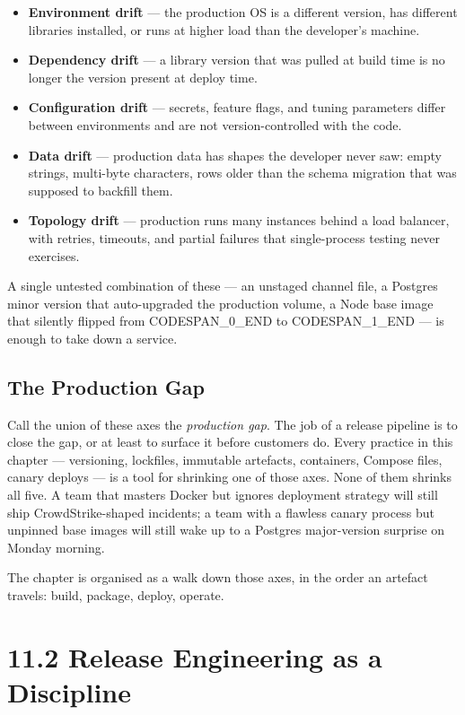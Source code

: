\documentclass[11pt,a4paper]{book}
\begin{document}
\begin{itemize}
  \item \textbf{Environment drift} --- the production OS is a different version, has different libraries installed, or runs at higher load than the developer's machine.
  \item \textbf{Dependency drift} --- a library version that was pulled at build time is no longer the version present at deploy time.
  \item \textbf{Configuration drift} --- secrets, feature flags, and tuning parameters differ between environments and are not version-controlled with the code.
  \item \textbf{Data drift} --- production data has shapes the developer never saw: empty strings, multi-byte characters, rows older than the schema migration that was supposed to backfill them.
  \item \textbf{Topology drift} --- production runs many instances behind a load balancer, with retries, timeouts, and partial failures that single-process testing never exercises.
\end{itemize}

A single untested combination of these --- an unstaged channel file, a Postgres minor version that auto-upgraded the production volume, a Node base image that silently flipped from CODESPAN\_0\_END to CODESPAN\_1\_END --- is enough to take down a service.

\subsection{The Production Gap}

Call the union of these axes the \textit{production gap}. The job of a release pipeline is to close the gap, or at least to surface it before customers do. Every practice in this chapter --- versioning, lockfiles, immutable artefacts, containers, Compose files, canary deploys --- is a tool for shrinking one of those axes. None of them shrinks all five. A team that masters Docker but ignores deployment strategy will still ship CrowdStrike-shaped incidents; a team with a flawless canary process but unpinned base images will still wake up to a Postgres major-version surprise on Monday morning.

The chapter is organised as a walk down those axes, in the order an artefact travels: build, package, deploy, operate.

\medskip

\section{11.2 Release Engineering as a Discipline}
\end{document}
